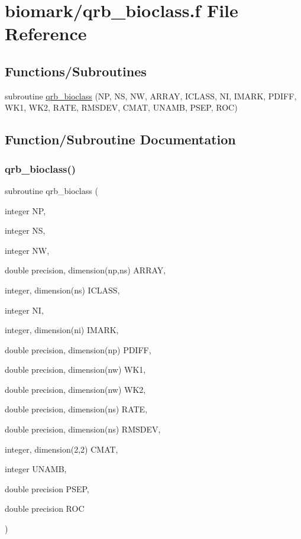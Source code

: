 \hypertarget{qrb__bioclass_8f}{}\section{biomark/qrb\+\_\+bioclass.f File Reference}
\label{qrb__bioclass_8f}
\subsection*{Functions/\+Subroutines}
\begin{DoxyCompactItemize}
\item 
subroutine \hyperlink{qrb__bioclass_8f_af70b52817c7bb3ec179bd118046d992d}{qrb\+\_\+bioclass} (NP, NS, NW, A\+R\+R\+AY, I\+C\+L\+A\+SS, NI, I\+M\+A\+RK, P\+D\+I\+FF, W\+K1, W\+K2, R\+A\+TE, R\+M\+S\+D\+EV, C\+M\+AT, U\+N\+A\+MB, P\+S\+EP, R\+OC)
\end{DoxyCompactItemize}


\subsection{Function/\+Subroutine Documentation}
\mbox{\label{qrb__bioclass_8f_af70b52817c7bb3ec179bd118046d992d}} 
\subsubsection{\texorpdfstring{qrb\+\_\+bioclass()}{qrb\_bioclass()}}
{\footnotesize\ttfamily subroutine qrb\+\_\+bioclass (\begin{DoxyParamCaption}\item[{integer}]{NP,  }\item[{integer}]{NS,  }\item[{integer}]{NW,  }\item[{double precision, dimension(np,ns)}]{A\+R\+R\+AY,  }\item[{integer, dimension(ns)}]{I\+C\+L\+A\+SS,  }\item[{integer}]{NI,  }\item[{integer, dimension(ni)}]{I\+M\+A\+RK,  }\item[{double precision, dimension(np)}]{P\+D\+I\+FF,  }\item[{double precision, dimension(nw)}]{W\+K1,  }\item[{double precision, dimension(nw)}]{W\+K2,  }\item[{double precision, dimension(ns)}]{R\+A\+TE,  }\item[{double precision, dimension(ns)}]{R\+M\+S\+D\+EV,  }\item[{integer, dimension(2,2)}]{C\+M\+AT,  }\item[{integer}]{U\+N\+A\+MB,  }\item[{double precision}]{P\+S\+EP,  }\item[{double precision}]{R\+OC }\end{DoxyParamCaption})}

